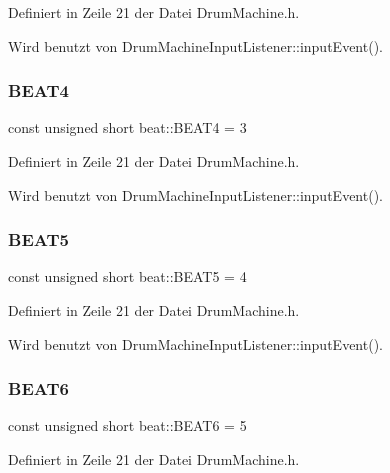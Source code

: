 Definiert in Zeile 21 der Datei Drum\+Machine.\+h.



Wird benutzt von Drum\+Machine\+Input\+Listener\+::input\+Event().

\mbox{\label{namespacebeat_acb66407079f4f750c8edf7c1bd8519df}} 
\subsubsection{\texorpdfstring{B\+E\+A\+T4}{BEAT4}}
{\footnotesize\ttfamily const unsigned short beat\+::\+B\+E\+A\+T4 = 3}



Definiert in Zeile 21 der Datei Drum\+Machine.\+h.



Wird benutzt von Drum\+Machine\+Input\+Listener\+::input\+Event().

\mbox{\label{namespacebeat_a1707525607992183af84b75b13bdcf1c}} 
\subsubsection{\texorpdfstring{B\+E\+A\+T5}{BEAT5}}
{\footnotesize\ttfamily const unsigned short beat\+::\+B\+E\+A\+T5 = 4}



Definiert in Zeile 21 der Datei Drum\+Machine.\+h.



Wird benutzt von Drum\+Machine\+Input\+Listener\+::input\+Event().

\mbox{\label{namespacebeat_a38be39fd5d7424553131d77620a5fbfc}} 
\subsubsection{\texorpdfstring{B\+E\+A\+T6}{BEAT6}}
{\footnotesize\ttfamily const unsigned short beat\+::\+B\+E\+A\+T6 = 5}



Definiert in Zeile 21 der Datei Drum\+Machine.\+h.



